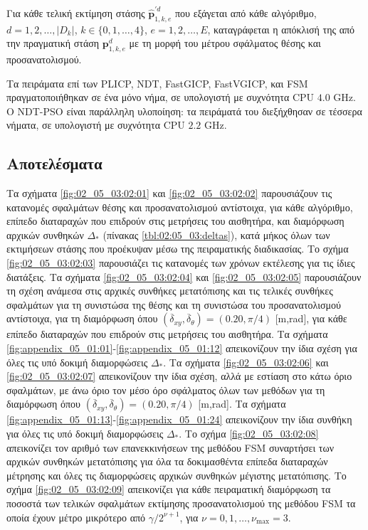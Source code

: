 Για κάθε τελική εκτίμηση στάσης $\hat{\bm{p}}_{1,k,e}^{\prime d}$ που εξάγεται
από κάθε αλγόριθμο, $d = 1,2,\dots,|D_k|$, $k \in \{0,1,\dots,4\}$,
$e=1,2,\dots,E$, καταγράφεται η απόκλισή της από την πραγματική στάση
$\bm{p}_{1,k,e}^d$ με τη μορφή του μέτρου σφάλματος θέσης και προσανατολισμού.

Τα πειράματα επί των  PLICP, NDT, FastGICP, FastVGICP, και FSM
πραγματοποιήθηκαν σε ένα μόνο νήμα, σε υπολογιστή με συχνότητα CPU $4.0$ GHz. Ο
NDT-PSO είναι παράλληλη υλοποίηση: τα πειράματά του διεξήχθησαν σε τέσσερα
νήματα, σε υπολογιστή με συχνότητα CPU $2.2$ GHz.




\subsection{Αποτελέσματα}
\label{subsection:02_05_03:02}

Τα σχήματα \ref{fig:02_05_03:02:01} και \ref{fig:02_05_03:02:02} παρουσιάζουν
τις κατανομές σφαλμάτων θέσης και προσανατολισμού αντίστοιχα, για κάθε
αλγόριθμο, επίπεδο διαταραχών που επιδρούν στις μετρήσεις του αισθητήρα, και
διαμόρφωση αρχικών συνθηκών $\Delta_\ast$ (πίνακας \ref{tbl:02:05_03:deltas}),
κατά μήκος όλων των εκτιμήσεων στάσης που προέκυψαν μέσω της πειραματικής
διαδικασίας. Το σχήμα \ref{fig:02_05_03:02:03} παρουσιάζει τις κατανομές των
χρόνων εκτέλεσης για τις ίδιες διατάξεις. Τα σχήματα \ref{fig:02_05_03:02:04}
και \ref{fig:02_05_03:02:05} παρουσιάζουν τη σχέση ανάμεσα στις αρχικές
συνθήκες μετατόπισης και τις τελικές συνθήκες σφαλμάτων για τη συνιστώσα της
θέσης και τη συνιστώσα του προσανατολισμού αντίστοιχα, για τη διαμόρφωση όπου
$(\overline{\delta}_{xy}, \overline{\delta}_{\theta}) = (0.20, \pi/4)$ [m,rad],
για κάθε επίπεδο διαταραχών που επιδρούν στις μετρήσεις του αισθητήρα.  Τα
σχήματα \ref{fig:appendix_05_01:01}-\ref{fig:appendix_05_01:12} απεικονίζουν
την ίδια σχέση για όλες τις υπό δοκιμή διαμορφώσεις $\Delta_\ast$.  Τα σχήματα
\ref{fig:02_05_03:02:06} και \ref{fig:02_05_03:02:07} απεικονίζουν την ίδια
σχέση, αλλά με εστίαση στο κάτω όριο σφαλμάτων, με άνω όριο τον μέσο όρο
σφάλματος όλων των μεθόδων για τη διαμόρφωση όπου $(\overline{\delta}_{xy},
\overline{\delta}_{\theta}) = (0.20, \pi/4)$ [m,rad]. Τα σχήματα
\ref{fig:appendix_05_01:13}-\ref{fig:appendix_05_01:24} απεικονίζουν την ίδια
συνθήκη για όλες τις υπό δοκιμή διαμορφώσεις $\Delta_*$. Το σχήμα
\ref{fig:02_05_03:02:08} απεικονίζει τον αριθμό των επανεκκινήσεων της μεθόδου
FSM συναρτήσει των αρχικών συνθηκών μετατόπισης για όλα τα δοκιμασθέντα επίπεδα
διαταραχών μέτρησης και όλες τις διαμορφώσεις αρχικών συνθηκών μέγιστης
μετατόπισης. Το σχήμα \ref{fig:02_05_03:02:09} απεικονίζει για κάθε πειραματική
διαμόρφωση τα ποσοστά των τελικών σφαλμάτων εκτίμησης προσανατολισμού της
μεθόδου FSM τα οποία έχουν μέτρο μικρότερο από $\gamma/2^{ν+1}$, για $\nu = 0,
1, \dots, \nu_{\max} = 3$.

